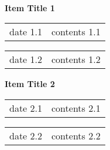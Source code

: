 \documentclass[10pt,letterpaper]{article}
\newcommand{\itemTitle}[1]{\begin{flushleft}\textbf{#1}\end{flushleft}}
\newcommand{\basicInfo}[2]{\begin{flushright}\small #1\\\small #2\end{flushright}}
\newcommand{\itemContents}[2]{\begin{tabularx}{\textwidth}{>{\quad}Xp{12.5cm}}#1&#2\end{tabularx}}
\begin{document}
\basicInfo{\affiliation}{\contact}
\begin{center}\end{center}
\itemTitle{Item Title 1}
\itemContents{date 1.1}{contents 1.1}
\itemContents{date 1.2}{contents 1.2}
\itemTitle{Item Title 2}
\itemContents{date 2.1}{contents 2.1}
\itemContents{date 2.2}{contents 2.2}
\end{document}
